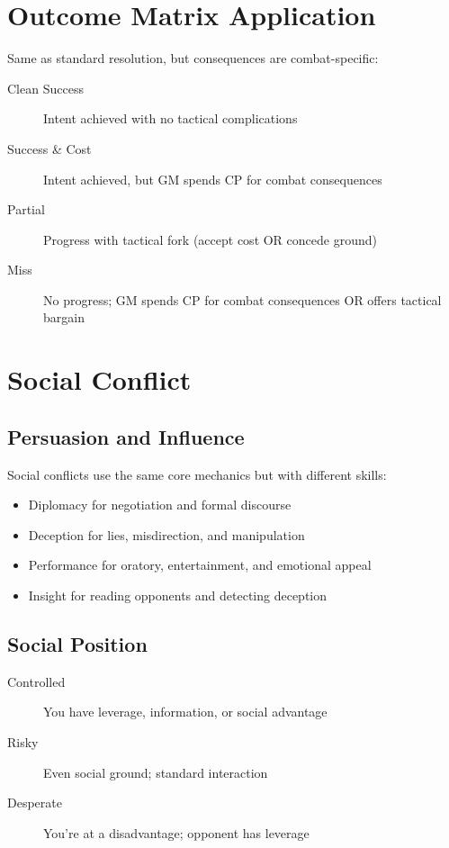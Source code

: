 \section{Outcome Matrix Application}
Same as standard resolution, but consequences are combat-specific:
\begin{description}
\item[Clean Success] Intent achieved with no tactical complications
\item[Success \& Cost] Intent achieved, but GM spends CP for combat consequences
\item[Partial] Progress with tactical fork (accept cost OR concede ground)
\item[Miss] No progress; GM spends CP for combat consequences OR offers tactical bargain
\end{description}

\section{Social Conflict}

\subsection{Persuasion and Influence}
Social conflicts use the same core mechanics but with different skills:
\begin{itemize}
\item Diplomacy for negotiation and formal discourse
\item Deception for lies, misdirection, and manipulation
\item Performance for oratory, entertainment, and emotional appeal
\item Insight for reading opponents and detecting deception
\end{itemize}

\subsection{Social Position}
\begin{description}
\item[Controlled] You have leverage, information, or social advantage
\item[Risky] Even social ground; standard interaction
\item[Desperate] You're at a disadvantage; opponent has leverage
\end{description}

